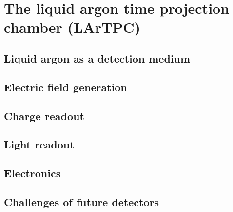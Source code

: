 \chapter{The liquid argon time projection chamber (LArTPC)\label{chap:lartpc}}


\section{Liquid argon as a detection medium\label{sec:lartpc_lar}}


\section{Electric field generation\label{sec:lartpc_efield}}


\section{Charge readout\label{sec:lartpc_readout}}


\section{Light readout\label{sec:lartpc_light}}


\section{Electronics\label{sec:lartpc_electronics}}


\section{Challenges of future detectors\label{sec:lartpc_challenges}}